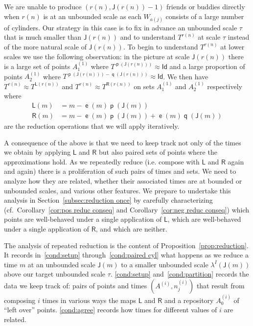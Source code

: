 \documentclass[10pt]{amsart}
\theoremstyle{definition}\newtheorem{defi}[theo]{Definition}\newtheorem{rema}[theo]{Remark}\newtheorem{exam}[theo]{Example}\newtheorem{exem}[theo]{Example}\newtheorem{nota}[theo]{Notation}
\DeclareMathOperator{\lst}{\mathsf{e}}
\DeclareMathOperator{\p}{\mathsf{p}}
\DeclareMathOperator{\q}{\mathsf{q}}
\newcommand{\id}{\mathsf{Id}}
\newcommand{\lft}{\mathsf{L}}
\newcommand{\rht}{\mathsf{R}}
\newcommand{\scl}{\mathsf{J}}
\begin{document}
We are unable to produce $(r(n), \scl(r(n))-1)$ friends or buddies directly when $r(n)$ is at an unbounded scale as each $W_{a(j)}$ consists of a large number of cylinders. Our strategy in this case is to fix in advance an unbounded scale $\tau$ that is much smaller than $\scl(r(n))$ and to understand $T^{r(n)}$ at scale $\tau$ instead of the more natural scale of $\scl(r(n))$. To begin to understand $T^{r(n)}$ at lower scales we use the following observation: in the picture at scale $\scl(r(n))$ there is a large set of points $A^{(1)}_1$ where $T^{\p(\scl(r(n)))} \approx \id$ and a large proportion of points $A^{(1)}_2$ where $T^{\p(\scl(r(n))) - \q(\scl(r(n)))} \approx \id$. We then have $T^{r(n)} \approx T^{\lft(r(n))}$ and $T^{r(n)} \approx T^{\rht(r(n))}$ on sets $A^{(1)}_1$ and $A^{(1)}_2$ respectively where
\begin{align*}
\lft(m) &= m - \lst(m) \p(\scl(m)) \\
\rht(m) &= m - \lst(m) \p(\scl(m)) + \lst(m) \q(\scl(m))
\end{align*}
are the reduction operations that we will apply iteratively.

A consequence of the above is that we need to keep track not only of the times we obtain by applying $\lft$ and $\rht$ but also paired sets of points where the approximations hold. As we repeatedly reduce (i.e. compose with $\lft$ and $\rht$ again and again) there is a proliferation of such pairs of times and sets. We need to analyze how they are related, whether their associated times are at bounded or unbounded scales, and various other features. We prepare to undertake this analysis in Section~\ref{subsec:reduction once} by carefully characterizing (cf.\ Corollary~\ref{cor:pos reduc conseq} and Corollary~\ref{cor:neg reduc conseq}) which points are well-behaved under a single application of $\lft$, which are well-behaved under a single application of $\rht$, and which are neither.

The analysis of repeated reduction is the content of Proposition~\ref{prop:reduction}. It records in~\eqref{cond:setup} through~\eqref{cond:paired cyl} what happens as we reduce a time $m$ at an unbounded scale $\scl(m)$ to a smaller unbounded scale $\lambda^I(\scl(m))$ above our target unbounded scale $\tau$. \eqref{cond:setup} and~\eqref{cond:partition} records the data we keep track of: pairs of points and times $(A^{(i)}, n^{(i)}_j)$ that result from composing $i$ times in various ways the maps $\lft$ and $\rht$ and a repository $A^{(i)}_0$ of ``left over'' points. \eqref{cond:agree} records how times for different values of $i$ are related.
\end{document}
